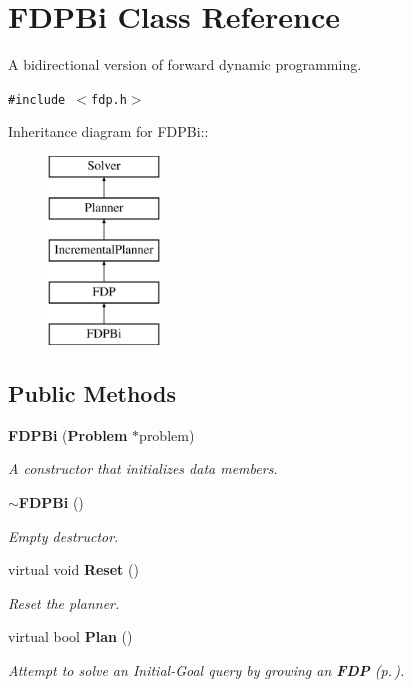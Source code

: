 \section{FDPBi  Class Reference}
\label{class_FDPBi}
A bidirectional version of forward dynamic programming. 


{\tt \#include $<$fdp.h$>$}

Inheritance diagram for FDPBi::\begin{figure}[H]
\begin{center}
\leavevmode
\includegraphics[height=5cm]{class_FDPBi}
\end{center}
\end{figure}
\subsection*{Public Methods}
\begin{CompactItemize}
\item 
{\bf FDPBi} ({\bf Problem} $\ast$problem)
\begin{CompactList}\small\item\em A constructor that initializes data members.\item\end{CompactList}\item 
{\bf $\sim$FDPBi} ()
\begin{CompactList}\small\item\em Empty destructor.\item\end{CompactList}\item 
virtual void {\bf Reset} ()
\begin{CompactList}\small\item\em Reset the planner.\item\end{CompactList}\item 
virtual bool {\bf Plan} ()
\begin{CompactList}\small\item\em Attempt to solve an Initial-Goal query by growing an {\bf FDP} {\rm (p.\,\pageref{class_FDP})}.\item\end{CompactList}\end{CompactItemize}
